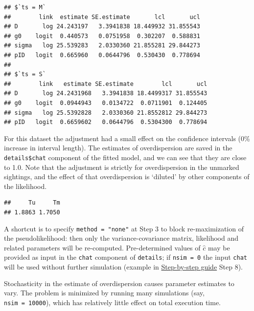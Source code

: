 \documentclass[
]{book}
\newenvironment{Shaded}{\begin{snugshade}}{\end{snugshade}}
\newcommand{\DecValTok}[1]{\textcolor[rgb]{0.00,0.00,0.81}{#1}}
\newcommand{\NormalTok}[1]{#1}
\newcommand{\SpecialCharTok}[1]{\textcolor[rgb]{0.81,0.36,0.00}{\textbf{#1}}}
\begin{document}
\begin{verbatim}
## $`ts = M`
##        link  estimate SE.estimate       lcl       ucl
## D       log 24.243197   3.3941838 18.449932 31.855543
## g0    logit  0.440573   0.0751958  0.302207  0.588831
## sigma   log 25.539283   2.0330360 21.855281 29.844273
## pID   logit  0.665960   0.0644796  0.530430  0.778694
## 
## $`ts = S`
##        link   estimate SE.estimate        lcl       ucl
## D       log 24.2431968   3.3941838 18.4499317 31.855543
## g0    logit  0.0944943   0.0134722  0.0711901  0.124405
## sigma   log 25.5392828   2.0330360 21.8552812 29.844273
## pID   logit  0.6659602   0.0644796  0.5304300  0.778694
\end{verbatim}

\vspace{8pt}

For this dataset the adjustment had a small effect on the confidence intervals (0\% increase in interval length). The estimates of overdispersion are saved in the \texttt{details\$chat} component of the fitted model, and we can see that they are close to 1.0. Note that the adjustment is strictly for overdispersion in the unmarked sightings, and the effect of that overdispersion is `diluted' by other components of the likelihood.

\begin{Shaded}
\end{Shaded}

\begin{verbatim}
##     Tu     Tm 
## 1.8863 1.7050
\end{verbatim}

A shortcut is to specify \texttt{method\ =\ "none"} at Step 3 to block re-maximization of the pseudolikelihood: then only the variance-covariance matrix, likelihood and related parameters will be re-computed. Pre-determined values of \(\hat c\) may be provided as input in the \texttt{chat} component of \texttt{details}; if \texttt{nsim\ =\ 0} the input \texttt{chat} will be used without further simulation (example in \hyperref[appendix1]{Step-by-step guide} Step 8).

Stochasticity in the estimate of overdispersion causes parameter estimates to vary. The problem is minimized by running many simulations (say, \texttt{nsim\ =\ 10000}), which has relatively little effect on total execution time.
\end{document}
